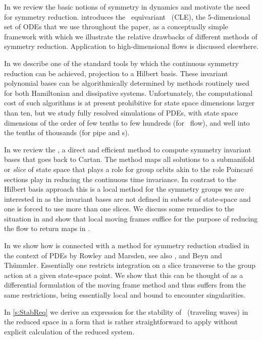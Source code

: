 In  we review the basic notions of symmetry
in dynamics and motivate the need for symmetry reduction.
 introduces the \ equivariant
\cLe\ (CLE), the 5-dimensional set of ODEs that we use
throughout the paper, as a conceptually  simple framework
with which we illustrate the relative drawbacks of different
methods of symmetry reduction. Application to
high-dimensional flows is discussed
elsewhere.

In  we describe one of the standard tools
by which the continuous symmetry reduction can be achieved,
projection to a Hilbert basis. These invariant polynomial
bases can be algorithmically determined by methods routinely
used for both Hamiltonian and dissipative systems.
Unfortunately, the computational cost of such algorithms is
at present prohibitive for state space dimensions larger than
ten, but we study fully resolved simulations of PDEs, with
state space dimensions of the order of few tenths to few
hundreds (for \KS\ flow), and well into the tenths of
thousands (for pipe and \pCf s).

In  we review the \emph{\mframes}, a direct
and efficient method to compute symmetry invariant bases that
goes back to Cartan. The method maps all solutions to a
submanifold or \emph{slice} of state space that plays a role
for group orbits akin to the role Poincar\'e sections play in
reducing the continuous time invariance. In contrast to the
Hilbert basis approach this is a local method for the
symmetry groups we are interested in as the invariant bases
are not defined in subsets of state-space and one is forced
to use more than one slices. We discuss some remedies to the
situation in 
and show that local moving frames suffice for the purpose of
reducing the flow to return maps in .

In  we show how {\mframes} is
connected with a method for symmetry reduction studied in the
context of PDEs by Rowley and
Marsden, see also
, and Beyn and
Th\"ummler.
Essentially one restricts integration on a slice transverse
to the group action at a given state-space point. We show
that this can be thought of as a differential formulation of
the moving frame method and thus suffers from the same
restrictions, being essentially local and bound to encounter
singularities.

In \ref{s:StabReq} we derive an expression for the stability
of \reqva\ (traveling waves) in the reduced space in a form
that is rather straightforward to apply without explicit
calculation of the reduced system.

